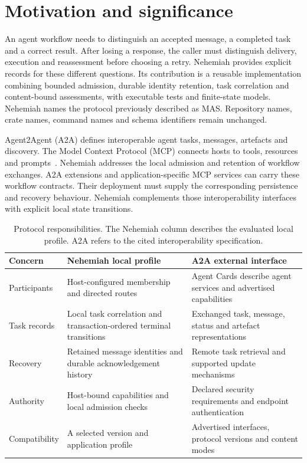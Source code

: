 \documentclass[preprint,12pt,a4paper]{elsarticle}
\begin{document}
\linenumbers
\section{Motivation and significance}
An agent workflow needs to distinguish an accepted message, a completed task and a correct result. After losing a response, the caller must distinguish delivery, execution and reassessment before choosing a retry. Nehemiah provides explicit records for these different questions. Its contribution is a reusable implementation combining bounded admission, durable identity retention, task correlation and content-bound assessments, with executable tests and finite-state models. Nehemiah names the protocol previously described as MAS. Repository names, crate names, command names and schema identifiers remain unchanged.

Agent2Agent (A2A) defines interoperable agent tasks, messages, artefacts and discovery. The Model Context Protocol (MCP) connects hosts to tools, resources and prompts~\citep{a2a,mcp}. Nehemiah addresses the local admission and retention of workflow exchanges. A2A extensions and application-specific MCP services can carry these workflow contracts. Their deployment must supply the corresponding persistence and recovery behaviour. Nehemiah complements those interoperability interfaces with explicit local state transitions.

\begin{table}[htbp]
\centering\small
\caption{Protocol responsibilities. The Nehemiah column describes the evaluated local profile. A2A refers to the cited interoperability specification.}
\label{tab:a2a-comparison}
\begin{tabularx}{\textwidth}{@{}>{\raggedright\arraybackslash}p{}>{\raggedright\arraybackslash}X>{\raggedright\arraybackslash}X@{}}
\toprule
Concern & Nehemiah local profile & A2A external interface \\
\midrule
Participants & Host-configured membership and directed routes & Agent Cards describe agent services and advertised capabilities \\
Task records & Local task correlation and transaction-ordered terminal transitions & Exchanged task, message, status and artefact representations \\
Recovery & Retained message identities and durable acknowledgement history & Remote task retrieval and supported update mechanisms \\
Authority & Host-bound capabilities and local admission checks & Declared security requirements and endpoint authentication \\
Compatibility & A selected version and application profile & Advertised interfaces, protocol versions and content modes \\
\bottomrule
\end{tabularx}
\end{table}
\end{document}
